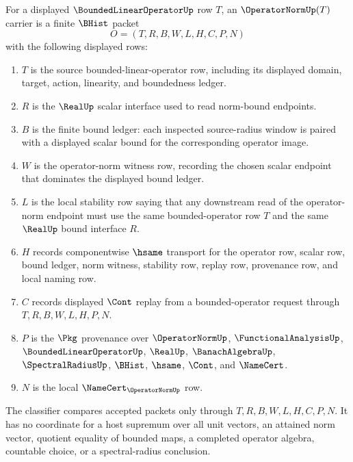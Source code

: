 \begin{definition}
\label{def:operator-norm-carrier}
For a displayed $\BoundedLinearOperatorUp$ row $T$, an $\OperatorNormUp(T)$ carrier is a finite $\BHist$ packet
$$
O=(T,R,B,W,L,H,C,P,N)
$$
with the following displayed rows:
\begin{enumerate}
\item $T$ is the source bounded-linear-operator row, including its displayed domain, target, action, linearity, and boundedness ledger.
\item $R$ is the $\RealUp$ scalar interface used to read norm-bound endpoints.
\item $B$ is the finite bound ledger: each inspected source-radius window is paired with a displayed scalar bound for the corresponding operator image.
\item $W$ is the operator-norm witness row, recording the chosen scalar endpoint that dominates the displayed bound ledger.
\item $L$ is the local stability row saying that any downstream read of the operator-norm endpoint must use the same bounded-operator row $T$ and the same $\RealUp$ bound interface $R$.
\item $H$ records componentwise $\hsame$ transport for the operator row, scalar row, bound ledger, norm witness, stability row, replay row, provenance row, and local naming row.
\item $C$ records displayed $\Cont$ replay from a bounded-operator request through $T,R,B,W,L,H,P,N$.
\item $P$ is the $\Pkg$ provenance over $\OperatorNormUp$, $\FunctionalAnalysisUp$, $\BoundedLinearOperatorUp$, $\RealUp$, $\BanachAlgebraUp$, $\SpectralRadiusUp$, $\BHist$, $\hsame$, $\Cont$, and $\NameCert$.
\item $N$ is the local $\NameCert_{\OperatorNormUp}$ row.
\end{enumerate}
The classifier compares accepted packets only through $T,R,B,W,L,H,C,P,N$. It has no coordinate for a host supremum over all unit vectors, an attained norm vector, quotient equality of bounded maps, a completed operator algebra, countable choice, or a spectral-radius conclusion.
\end{definition}

